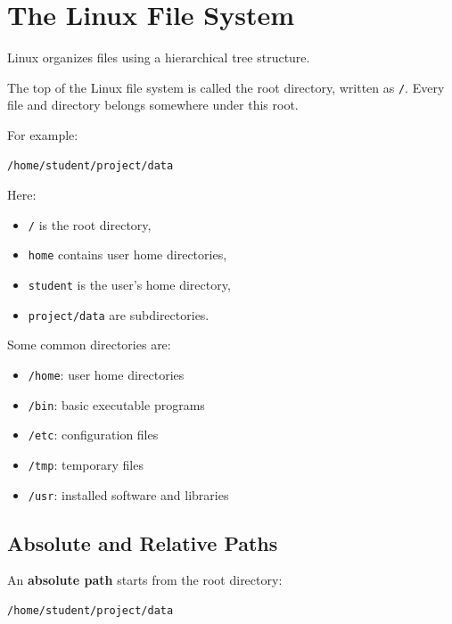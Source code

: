 \section{The Linux File System}

Linux organizes files using a hierarchical tree structure.

\begin{defbox}
The top of the Linux file system is called the root directory, written
as \texttt{/}. Every file and directory belongs somewhere under this root.
\end{defbox}

For example:

\begin{lstlisting}
/home/student/project/data
\end{lstlisting}

Here:

\begin{itemize}
\item \texttt{/} is the root directory,
\item \texttt{home} contains user home directories,
\item \texttt{student} is the user's home directory,
\item \texttt{project/data} are subdirectories.
\end{itemize}

Some common directories are:

\begin{itemize}
\item \texttt{/home}: user home directories
\item \texttt{/bin}: basic executable programs
\item \texttt{/etc}: configuration files
\item \texttt{/tmp}: temporary files
\item \texttt{/usr}: installed software and libraries
\end{itemize}

\subsection{Absolute and Relative Paths}

An \textbf{absolute path} starts from the root directory:

\begin{lstlisting}
/home/student/project/data
\end{lstlisting}

